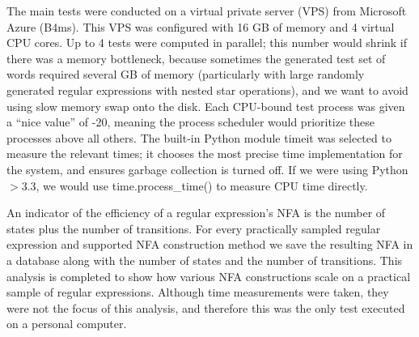 The main tests were conducted on a virtual private server (VPS) from Microsoft Azure (B4ms). This VPS was configured with 16 GB of memory and 4 virtual CPU cores. Up to 4 tests were computed in parallel; this number would shrink if there was a memory bottleneck, because sometimes the generated test set of words required several GB of memory (particularly with large randomly generated regular expressions with nested star operations), and we want to avoid using slow memory swap onto the disk. Each CPU-bound test process was given a ``nice value'' of -20, meaning the process scheduler would prioritize these processes above all others. The built-in Python module timeit was selected to measure the relevant times; it chooses the most precise time implementation for the system, and ensures garbage collection is turned off. If we were using Python $>3.3$, we would use time.process\_time() to measure CPU time directly. 

An indicator of the efficiency of a regular expression's NFA is the number of states plus the number of transitions. For every practically sampled regular expression and supported NFA construction method we save the resulting NFA in a database \cite{dill} along with the number of states and the number of transitions. This analysis is completed to show how various NFA constructions scale on a practical sample of regular expressions. Although time measurements were taken, they were not the focus of this analysis, and therefore this was the only test executed on a personal computer.



























